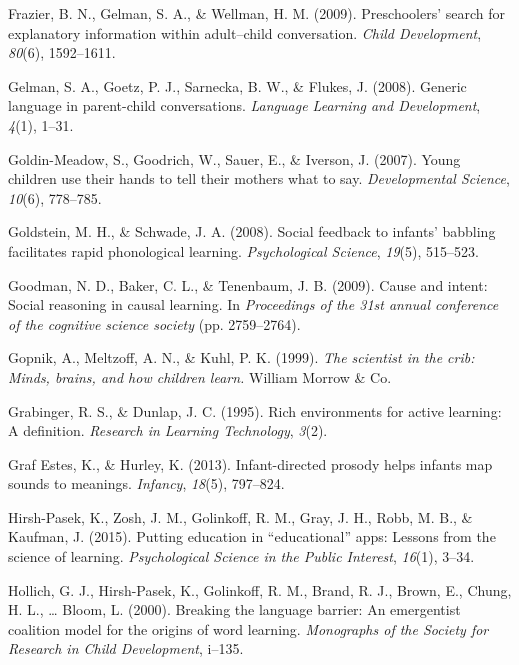 \documentclass[a4paper,man,apacite,floatsintext]{apa6}
\begin{document}
\hypertarget{ref-frazier2009preschoolers}{}
Frazier, B. N., Gelman, S. A., \& Wellman, H. M. (2009). Preschoolers'
search for explanatory information within adult--child conversation.
\emph{Child Development}, \emph{80}(6), 1592--1611.

\hypertarget{ref-gelman2008generic}{}
Gelman, S. A., Goetz, P. J., Sarnecka, B. W., \& Flukes, J. (2008).
Generic language in parent-child conversations. \emph{Language Learning
and Development}, \emph{4}(1), 1--31.

\hypertarget{ref-goldin2007young}{}
Goldin-Meadow, S., Goodrich, W., Sauer, E., \& Iverson, J. (2007). Young
children use their hands to tell their mothers what to say.
\emph{Developmental Science}, \emph{10}(6), 778--785.

\hypertarget{ref-goldstein2008social}{}
Goldstein, M. H., \& Schwade, J. A. (2008). Social feedback to infants'
babbling facilitates rapid phonological learning. \emph{Psychological
Science}, \emph{19}(5), 515--523.

\hypertarget{ref-goodman2009cause}{}
Goodman, N. D., Baker, C. L., \& Tenenbaum, J. B. (2009). Cause and
intent: Social reasoning in causal learning. In \emph{Proceedings of the
31st annual conference of the cognitive science society} (pp.
2759--2764).

\hypertarget{ref-gopnik1999scientist}{}
Gopnik, A., Meltzoff, A. N., \& Kuhl, P. K. (1999). \emph{The scientist
in the crib: Minds, brains, and how children learn.} William Morrow \&
Co.

\hypertarget{ref-grabinger1995rich}{}
Grabinger, R. S., \& Dunlap, J. C. (1995). Rich environments for active
learning: A definition. \emph{Research in Learning Technology},
\emph{3}(2).

\hypertarget{ref-graf2013infant}{}
Graf Estes, K., \& Hurley, K. (2013). Infant-directed prosody helps
infants map sounds to meanings. \emph{Infancy}, \emph{18}(5), 797--824.

\hypertarget{ref-hirsh2015putting}{}
Hirsh-Pasek, K., Zosh, J. M., Golinkoff, R. M., Gray, J. H., Robb, M.
B., \& Kaufman, J. (2015). Putting education in ``educational'' apps:
Lessons from the science of learning. \emph{Psychological Science in the
Public Interest}, \emph{16}(1), 3--34.

\hypertarget{ref-hollich2000breaking}{}
Hollich, G. J., Hirsh-Pasek, K., Golinkoff, R. M., Brand, R. J., Brown,
E., Chung, H. L., \ldots{} Bloom, L. (2000). Breaking the language
barrier: An emergentist coalition model for the origins of word
learning. \emph{Monographs of the Society for Research in Child
Development}, i--135.
\end{document}
